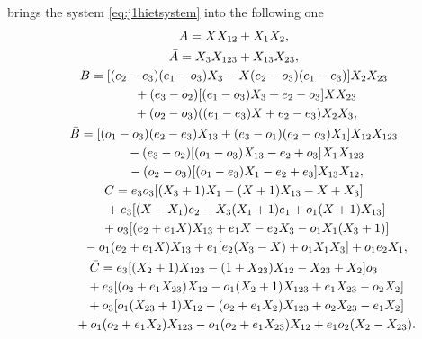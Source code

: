 \documentclass[pdftex]{sigma}
\numberwithin{equation}{section}
\begin{document}
brings the system \eqref{eq:j1hietsystem} into the following one
\begin{subequations} \label{eq:j1hietsystemm}
 \begin{gather}
 A = X X_{12} + X_{1}X_{2}, \label{eq:j1hietAm} \\
 \bar{A} =X_{3} X_{123} + X_{13}X_{23}, \label{eq:j1hietAtm} \\
 B =[ ( { e_{2}} -{ e_{3}})
 ( { e_{1}}-{o_{3}} ) { X_{3}}
 -X ( { e_{2}}-{ o_{3}} ) ( {e_{1}}-{ e_{3}} ) ] { X_{2}}X_{23}\nonumber\\
 \hphantom{B=}{} + ( { e_{3}}-{ o_{2}})
 [ ( { e_{1}}-{ o_{3}} ) {X_{3}}+{e_{2}}-{ o_{3}} ] X X_{23}\nonumber \\
 \hphantom{B=}{}+( {o_{2}}-{ o_{3}} ) ( ( { e_{1}}-{ e_{3}} ) X+{ e_{2}}-{ e_{3}} ) { X_{2}}{ X_{3}}, \label{eq:j1hietBm} \\
 \bar{B} =
 [ ( { o_{1}}-{ o_{3}} )
 ( {e_{2}} -{ e_{3}}) { X_{13}}
 +( { e_{3}}-{ o_{1}} )
 ( { e_{2}}-{ o_{3}} ) { X_{1}} ] { X_{12}}X_{123}\nonumber \\
 \hphantom{\bar{B} =}{} -
 ( { e_{3}}-{ o_{2}} )
 [ ( { o_{1}}-{ o_{3}}) { X_{13}}-{ e_{2}}+{ o_{3}} ]
 X_{1} { X_{123}}\nonumber \\
 \hphantom{\bar{B} =}{}- ( { o_{2}}-{ o_{3}} )
 [ ( { o_{1}} -{ e_{3}}) { X_{1}}-{ e_{2}}+{ e_{3}} ]
 { X_{13}}{ X_{12}}, \label{eq:j1hietBtm} \\
 C =
 e_{3}{ o_{3}}
 [( { X_{3}}+1) { X_{1}} -( X+1 ) { X_{13}}-X+{ X_{3}} ]\nonumber \\
 \hphantom{C=}{} +{ e_{3}}[
 ( X-{ X_{1}} ) { e_{2}}-{ X_{3}}
 ( { X_{1}}+1 ) { e_{1}}+ { o_{1}} ( X+1 ) {X_{13}} ]\nonumber \\
 \hphantom{C=}{}+
 { o_{3}}
 [ (
 { e_{2}}+{ e_{1}} X ) { X_{13}}+{ e_{1}} X-{ e_{2}} { X_{3}}
 - { o_{1}}{ X_{1}} ( { X_{3}}+1 ) ]\nonumber \\
 \hphantom{C=}{}-{o_{1}}( { e_{2}}+{ e_{1}} X ) { X_{13}}
 +e_{1} [ { e_{2}} ({X_{3}}-X )
 +{ o_{1}}{ X_{1}} { X_{3}} ]
 +{ o_{1}} { e_{2}}{ X_{1}}, \label{eq:j1hietCm} \\
 \bar{C} =
 e_{3}
 [ ( { X_{2}}+1 ) { X_{123}}
 -( 1+{X_{23}} ) { X_{12}}
 -{ X_{23}}+{ X_{2}} ] { o_{3}}\nonumber \\
 \hphantom{\bar{C} =}{} +{ e_{3}}[
 ( { o_{2}}+{ e_{1}} {X_{23}} ) { X_{12}}
 -{ o_{1}} ( { X_{2}}+1 ) { X_{123}}
 +{ e_{1}} { X_{23}}-{ o_{2}} { X_{2}} ]\nonumber \\
 \hphantom{\bar{C} =}{}+o_{3}
 [ { o_{1}} ( { X_{23}}+1 ) { X_{12}}
 -( { o_{2}}+{ e_{1}} { X_{2}}) { X_{123}}+
 {o_{2}} { X_{23}}-{ e_{1}} { X_{2}} ]\nonumber \\
 \hphantom{\bar{C} =}{}+{ o_{1}}
 ( { o_{2}}+{ e_{1}} { X_{2}} ) { X_{123}}-{ o_{1}}
 ( { o_{2}}+{ e_{1}} { X_{23}} ) { X_{12}}+{ e_{1}} {
 o_{2}} ( { X_{2}} -{ X_{23}}). \label{eq:j1hietCtm}
 \end{gather}
\end{subequations}
\end{document}
